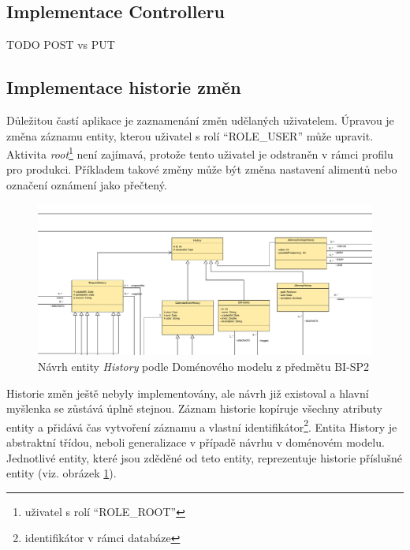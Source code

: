     \subsection{Implementace Controlleru}
        TODO POST vs PUT
    
    \subsection{Implementace historie změn}
        Důležitou častí aplikace je zaznamenání změn udělaných uživatelem. Úpravou je změna záznamu entity, kterou uživatel s rolí \enquote{ROLE\_USER} může upravit. Aktivita \textit{root}\footnote{uživatel s rolí \enquote{ROLE\_ROOT}} není zajímavá, protože tento uživatel je odstraněn v rámci profilu pro produkci. Příkladem takové změny může být změna nastavení alimentů nebo označení oznámení jako přečtený.
    
        \begin{figure}\centering
	        \includegraphics[width=1.0\textwidth]{pdfs/History1}
	        \caption[Návrh entity History]{Návrh entity \textit{History} podle Doménového modelu z předmětu BI-SP2}\label{image:History1}
        \end{figure}
        Historie změn ještě nebyly implementovány, ale návrh již existoval a hlavní myšlenka se zůstává úplně stejnou. Záznam historie kopíruje všechny atributy entity a přidává čas vytvoření záznamu a vlastní identifikátor\footnote{identifikátor v rámci databáze}. Entita History je abstraktní třídou, neboli generalizace v případě návrhu v doménovém modelu. Jednotlivé entity, které jsou zděděné od teto entity, reprezentuje historie příslušné entity (viz. obrázek \ref{image:History1}). 
    
